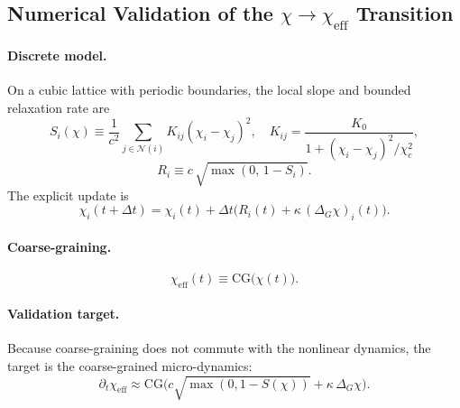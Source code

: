 \subsection{Numerical Validation of the
\texorpdfstring{$\chi \to \chi_{\mathrm{eff}}$}%
{χ→χeff} Transition}
\label{subsec:chi_eff-validation}

\paragraph{Discrete model.}
On a cubic lattice with periodic boundaries, the local slope and
bounded relaxation rate are
\begin{equation}
  S_i(\chi)
  \equiv
  \frac{1}{c^2}
    \sum_{j\in\mathcal{N}(i)}
      K_{ij}(\chi_i - \chi_j)^2,
  \quad
  K_{ij}
  = \frac{K_0}
         {1 + (\chi_i - \chi_j)^2/\chi_c^2},
  \label{eq:D4_Si_Kij}
\end{equation}
\begin{equation}
  R_i \equiv c\,\sqrt{\max(0,\,1-S_i)}.
  \label{eq:D4_Ri_def}
\end{equation}
The explicit update is
\begin{equation}
  \chi_i(t+\Delta t)
  = \chi_i(t)
    + \Delta t\bigl(
        R_i(t) + \kappa\,(\Delta_G\chi)_i(t)
      \bigr).
  \label{eq:D4_update}
\end{equation}

\paragraph{Coarse-graining.}
\begin{equation}
  \chi_{\mathrm{eff}}(t)
  \equiv \mathrm{CG}\bigl(\chi(t)\bigr).
  \label{eq:D4_chi_eff_def}
\end{equation}

\paragraph{Validation target.}
Because coarse-graining does not commute with the nonlinear dynamics,
the target is the coarse-grained micro-dynamics:
\begin{equation}
  \partial_t \chi_{\mathrm{eff}}
  \approx
  \mathrm{CG}\!\Big(
    c\sqrt{\max(0,1-S(\chi))}
    + \kappa\,\Delta_G\chi
  \Big).
  \label{eq:D4_target_cg_dynamics}
\end{equation}


